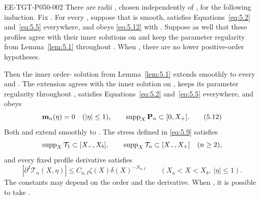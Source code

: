 \begin{lemma}\label{lem:5.2}
\begin{EESegment}{EE-TGT-P050-002}
There are radii , chosen independently of
, for the following induction. Fix . For every
, suppose that  is smooth, satisfies
Equations~\eqref{eq:5.2} and~\eqref{eq:5.5} everywhere, and obeys \eqref{eq:5.12} with
. Suppose as well that these profiles agree with their inner solutions on
 and keep the parameter regularity from Lemma~\ref{lem:5.1} throughout
. When , there are no lower positive-order hypotheses.

Then the inner order- solution from Lemma~\ref{lem:5.1} extends smoothly to every
 and . The extension agrees with the inner solution on
, keeps its parameter regularity throughout , satisfies
Equations~\eqref{eq:5.2} and~\eqref{eq:5.5} everywhere, and obeys
\begin{equation}\label{eq:5.12}
\mathbf m_n(\eta)=0\quad (|\eta|\leq1),
\qquad
\operatorname{supp}_X\mathbf P_n\subset[0,X_+].
\tag{5.12}
\end{equation}
Both  and  extend smoothly to
. The stress defined in \eqref{eq:5.9} satisfies
\[
\operatorname{supp}_X\mathcal T_1\subset[X_-,X_b],
\qquad
\operatorname{supp}_X\mathcal T_n\subset[X_-,X_+]\quad(n\geq2),
\]
and every fixed profile derivative  satisfies
\begin{equation}\label{eq:5.13}
|\partial^I\mathcal T_n(X,\eta)|
\leq C_{n,I}\zeta(X)\delta(X)^{-N_{n,I}}
\qquad (X_a<X<X_b,\ |\eta|\leq1).
\tag{5.13}
\end{equation}
The constants  may depend on the order and the derivative. When
, it is possible to take .
\end{EESegment}
\end{lemma}

